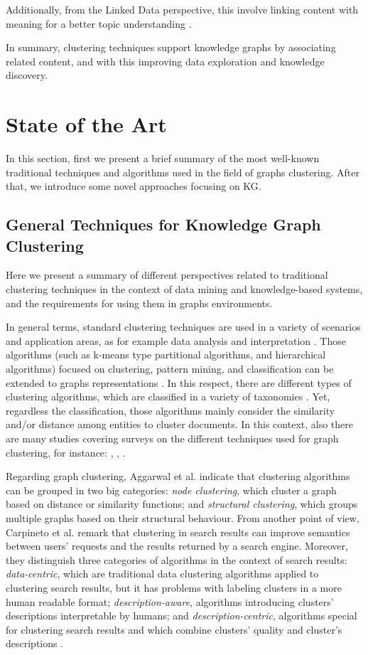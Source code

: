 \documentclass[runningheads]{llncs}
\begin{document}
Additionally, from the Linked Data perspective, this involve linking content with meaning for a better topic understanding \cite{Pan}.

In summary, clustering techniques support knowledge graphs by associating related content, and with this improving data exploration and knowledge discovery.


\section{State of the Art}\label{state-art}
In this section, first we present a brief summary of the most well-known traditional techniques and algorithms used in the field of graphs clustering. After that, we introduce some novel approaches focusing on KG. 

\subsection{General Techniques for Knowledge Graph Clustering} \label{general-techniques}
Here we present a summary of different perspectives related to traditional clustering techniques in the context of data mining and knowledge-based systems, and the requirements for using them in graphs environments.

In general terms, standard clustering techniques are used in a variety of scenarios and application areas, as for example data analysis and interpretation \cite{Pedrycz}. Those algorithms (such as k-means type partitional algorithms, and hierarchical algorithms) focused on clustering, pattern mining, and classification can be extended to graphs representations \cite{Aggarwal}. In this respect, there are different types of clustering algorithms, which are classified in a variety of taxonomies \cite{Zacharski} \cite{Pedrycz} \cite{Berkhin}. Yet, regardless the classification, those algorithms mainly consider the similarity and/or distance among entities \cite{Pedrycz} to cluster documents. In this context, also there are many studies covering surveys on the different techniques used for graph clustering, for instance: \cite{Schaeffer}, \cite{Aggarwal}, \cite{Carpineto}. 

Regarding graph clustering, Aggarwal et al. \cite{Aggarwal} indicate that clustering algorithms can be grouped in two big categories: \textit{node clustering}, which cluster a graph based on distance or similarity functions; and \textit{structural clustering}, which groups multiple graphs based on their structural behaviour. From another point of view, Carpineto et al. \cite{Carpineto} remark that clustering in search results can improve semantics between users' requests and the results returned by a search engine. Moreover, they distinguish three categories of algorithms in the context of search results: \textit{data-centric}, which are traditional data clustering algorithms applied to clustering search results, but it has problems with labeling clusters in a more human readable format; \textit{description-aware}, algorithms introducing clusters' descriptions interpretable by humans; and \textit{description-centric}, algorithms special for clustering search results and which combine clusters' quality and cluster's descriptions \cite{Carpineto}.
\end{document}
